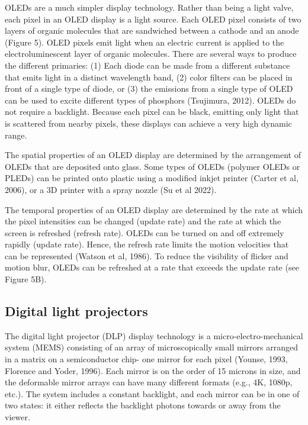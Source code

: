 \documentclass[
  letterpaper,
]{book}
\begin{document}
OLEDs are a much simpler display technology. Rather than being a light
valve, each pixel in an OLED display is a light source. Each OLED pixel
consists of two layers of organic molecules that are sandwiched between
a cathode and an anode (Figure 5). OLED pixels emit light when an
electric current is applied to the electroluminescent layer of organic
molecules. There are several ways to produce the different primaries:
(1) Each diode can be made from a different substance that emits light
in a distinct wavelength band, (2) color filters can be placed in front
of a single type of diode, or (3) the emissions from a single type of
OLED can be used to excite different types of phosphors (Tsujimura,
2012). OLEDs do not require a backlight. Because each pixel can be
black, emitting only light that is scattered from nearby pixels, these
displays can achieve a very high dynamic range.

The spatial properties of an OLED display are determined by the
arrangement of OLEDs that are deposited onto glass. Some types of OLEDs
(polymer OLEDs or PLEDs) can be printed onto plastic using a modified
inkjet printer (Carter et al, 2006), or a 3D printer with a spray nozzle
(Su et al 2022).

The temporal properties of an OLED display are determined by the rate at
which the pixel intensities can be changed (update rate) and the rate at
which the screen is refreshed (refresh rate). OLEDs can be turned on and
off extremely rapidly (update rate). Hence, the refresh rate limits the
motion velocities that can be represented (Watson et al, 1986). To
reduce the visibility of flicker and motion blur, OLEDs can be refreshed
at a rate that exceeds the update rate (see Figure 5B).

\subsection{\texorpdfstring{\textbf{Digital light
projectors}}{Digital light projectors}}\label{digital-light-projectors}

The digital light projector (DLP) display technology is a
micro-electro-mechanical system (MEMS) consisting of an array of
microscopically small mirrors arranged in a matrix on a semiconductor
chip- one mirror for each pixel (Younse, 1993, Florence and Yoder,
1996). Each mirror is on the order of 15 microns in size, and the
deformable mirror arrays can have many different formats (e.g., 4K,
1080p, etc.). The system includes a constant backlight, and each mirror
can be in one of two states: it either reflects the backlight photons
towards or away from the viewer.
\end{document}
